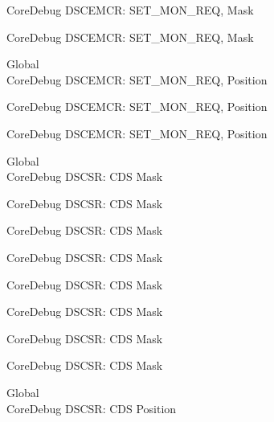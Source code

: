 \begin{DoxyRefList}
\label{deprecated__deprecated000527}%
%
Core\+Debug DSCEMCR\+: SET\+\_\+\+MON\+\_\+\+REQ, Mask 

\label{deprecated__deprecated000629}%
%
Core\+Debug DSCEMCR\+: SET\+\_\+\+MON\+\_\+\+REQ, Mask  
\item[Global \doxylink{group___c_m_s_i_s___s_c_b_ga77f02a6d773fa2c6daafbbdd7df2d9d2}{Core\+Debug\+\_\+\+DSCEMCR\+\_\+\+SET\+\_\+\+MON\+\_\+\+REQ\+\_\+\+Pos} ]\hfill \\
\label{deprecated__deprecated000075}%
%
Core\+Debug DSCEMCR\+: SET\+\_\+\+MON\+\_\+\+REQ, Position 

\label{deprecated__deprecated000526}%
%
Core\+Debug DSCEMCR\+: SET\+\_\+\+MON\+\_\+\+REQ, Position 

\label{deprecated__deprecated000628}%
%
Core\+Debug DSCEMCR\+: SET\+\_\+\+MON\+\_\+\+REQ, Position  
\item[Global \doxylink{group___c_m_s_i_s___s_c_b_ga083417245e1aa40e84a2b12433a15a6b}{Core\+Debug\+\_\+\+DSCSR\+\_\+\+CDS\+\_\+\+Msk} ]\hfill \\
\label{deprecated__deprecated000094}%
%
Core\+Debug DSCSR\+: CDS Mask 

\label{deprecated__deprecated000148}%
%
Core\+Debug DSCSR\+: CDS Mask 

\label{deprecated__deprecated000224}%
%
Core\+Debug DSCSR\+: CDS Mask 

\label{deprecated__deprecated000287}%
%
Core\+Debug DSCSR\+: CDS Mask 

\label{deprecated__deprecated000366}%
%
Core\+Debug DSCSR\+: CDS Mask 

\label{deprecated__deprecated000442}%
%
Core\+Debug DSCSR\+: CDS Mask 

\label{deprecated__deprecated000545}%
%
Core\+Debug DSCSR\+: CDS Mask 

\label{deprecated__deprecated000647}%
%
Core\+Debug DSCSR\+: CDS Mask  
\item[Global \doxylink{group___c_m_s_i_s___s_c_b_ga4be5d0f8af5d7d8ec04bde78ce18e10e}{Core\+Debug\+\_\+\+DSCSR\+\_\+\+CDS\+\_\+\+Pos} ]\hfill \\
\label{deprecated__deprecated000093}%
%
Core\+Debug DSCSR\+: CDS Position 


\end{DoxyRefList}

